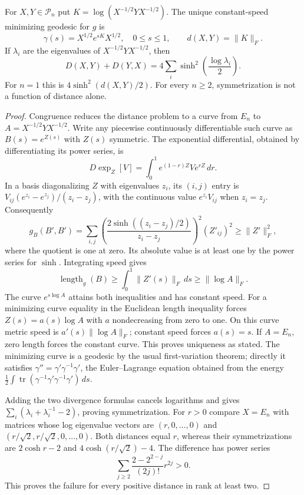 \begin{theorem}
\label{final:M3}
For $X,Y\in\mathcal P_n$ put
$K=\log(X^{-1/2}YX^{-1/2})$.  The unique constant-speed minimizing
geodesic for $g$ is
\[
 \gamma(s)=X^{1/2}e^{sK}X^{1/2},\quad0\leq s\leq1,
 \qquad d(X,Y)=\|K\|_F.
\]
If $\lambda_i$ are the eigenvalues of $X^{-1/2}YX^{-1/2}$, then
\[
 D(X,Y)+D(Y,X)=4\sum_i\sinh^2\left(\frac{\log\lambda_i}{2}\right).
\]
For $n=1$ this is $4\sinh^2(d(X,Y)/2)$.  For every $n\geq2$,
symmetrization is not a function of distance alone.
\end{theorem}

\begin{proof}
Congruence reduces the distance problem to a curve from $E_n$ to
$A=X^{-1/2}YX^{-1/2}$.  Write any piecewise continuously differentiable
such curve as $B(s)=e^{Z(s)}$ with $Z(s)$ symmetric.  The exponential
differential, obtained by differentiating its power series, is
\[
 D\exp_Z[V]=\int_0^1e^{(1-r)Z}Ve^{rZ}\,dr.
\]
In a basis diagonalizing $Z$ with eigenvalues $z_i$, its $(i,j)$ entry
is $V_{ij}(e^{z_i}-e^{z_j})/(z_i-z_j)$, with the continuous value
$e^{z_i}V_{ij}$ when $z_i=z_j$.  Consequently
\[
 g_B(B',B')=
 \sum_{i,j}\left(\frac{2\sinh((z_i-z_j)/2)}{z_i-z_j}\right)^2
                        (Z'_{ij})^2\geq\|Z'\|_F^2,
\]
where the quotient is one at zero.  Its absolute value is at least
one by the power series for $\sinh$.  Integrating speed gives
\[
 \operatorname{length}_g(B)\geq\int_0^1\|Z'(s)\|_F\,ds
                  \geq\|\log A\|_F.
\]
The curve $e^{s\log A}$ attains both inequalities and has constant
speed.  For a minimizing curve equality in the Euclidean length
inequality forces $Z(s)=a(s)\log A$ with $a$ nondecreasing from zero
to one.  On this curve metric speed is $a'(s)\|\log A\|_F$;
constant speed forces $a(s)=s$.  If $A=E_n$, zero length forces the
constant curve.  This proves uniqueness as stated.  The minimizing
curve is a geodesic by the usual first-variation theorem; directly
it satisfies $\gamma''=\gamma'\gamma^{-1}\gamma'$, the Euler--Lagrange
equation obtained from the energy
$\frac12\int\operatorname{tr}(\gamma^{-1}\gamma'
\gamma^{-1}\gamma')\,ds$.

Adding the two divergence formulas cancels logarithms and gives
$\sum_i(\lambda_i+\lambda_i^{-1}-2)$, proving symmetrization.
For $r>0$ compare $X=E_n$ with matrices whose log eigenvalue vectors
are $(r,0,\ldots,0)$ and
$(r/\sqrt2,r/\sqrt2,0,\ldots,0)$.  Both distances equal $r$, whereas
their symmetrizations are $2\cosh r-2$ and
$4\cosh(r/\sqrt2)-4$.  The difference has power series
\[
 \sum_{j\geq2}\frac{2-2^{2-j}}{(2j)!}r^{2j}>0.
\]
This proves the failure for every positive distance in rank at least two.
\end{proof}

